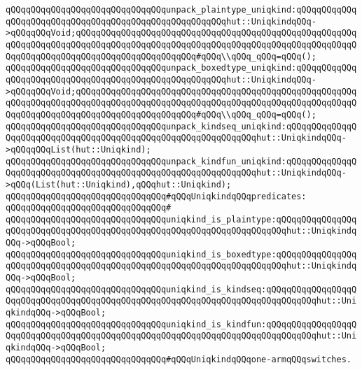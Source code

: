 \verb|qQQqqQQqqQQqqQQqqQQqqQQqqQQqqQQqunpack_plaintype_uniqkind:qQQqqQQqqQQqqQQqqQQqqQQqqQQqqQQqqQQqqQQqqQQqqQQqqQQqqQQqhut::UniqkindqQQq->qQQqqQQqVoid;qQQqqQQqqQQqqQQqqQQqqQQqqQQqqQQqqQQqqQQqqQQqqQQqqQQqqQQqqQQqqQQqqQQqqQQqqQQqqQQqqQQqqQQqqQQqqQQqqQQqqQQqqQQqqQQqqQQqqQQqqQQqqQQqqQQqqQQqqQQqqQQqqQQqqQQqqQQqqQQqqQQq#qQQq\\qQQq_qQQq=qQQq();|\newline
\verb|qQQqqQQqqQQqqQQqqQQqqQQqqQQqqQQqunpack_boxedtype_uniqkind:qQQqqQQqqQQqqQQqqQQqqQQqqQQqqQQqqQQqqQQqqQQqqQQqqQQqqQQqhut::UniqkindqQQq->qQQqqQQqVoid;qQQqqQQqqQQqqQQqqQQqqQQqqQQqqQQqqQQqqQQqqQQqqQQqqQQqqQQqqQQqqQQqqQQqqQQqqQQqqQQqqQQqqQQqqQQqqQQqqQQqqQQqqQQqqQQqqQQqqQQqqQQqqQQqqQQqqQQqqQQqqQQqqQQqqQQqqQQqqQQqqQQq#qQQq\\qQQq_qQQq=qQQq();|\newline
\verb|qQQqqQQqqQQqqQQqqQQqqQQqqQQqqQQqunpack_kindseq_uniqkind:qQQqqQQqqQQqqQQqqQQqqQQqqQQqqQQqqQQqqQQqqQQqqQQqqQQqqQQqqQQqqQQqhut::UniqkindqQQq->qQQqqQQqList(hut::Uniqkind);|\newline
\verb|qQQqqQQqqQQqqQQqqQQqqQQqqQQqqQQqunpack_kindfun_uniqkind:qQQqqQQqqQQqqQQqqQQqqQQqqQQqqQQqqQQqqQQqqQQqqQQqqQQqqQQqqQQqqQQqhut::UniqkindqQQq->qQQq(List(hut::Uniqkind),qQQqhut::Uniqkind);|\newline
\newline
\verb|qQQqqQQqqQQqqQQqqQQqqQQqqQQqqQQq#qQQqUniqkindqQQqpredicates:|\newline
\verb|qQQqqQQqqQQqqQQqqQQqqQQqqQQqqQQq#|\newline
\verb|qQQqqQQqqQQqqQQqqQQqqQQqqQQqqQQquniqkind_is_plaintype:qQQqqQQqqQQqqQQqqQQqqQQqqQQqqQQqqQQqqQQqqQQqqQQqqQQqqQQqqQQqqQQqqQQqqQQqhut::UniqkindqQQq->qQQqBool;|\newline
\verb|qQQqqQQqqQQqqQQqqQQqqQQqqQQqqQQquniqkind_is_boxedtype:qQQqqQQqqQQqqQQqqQQqqQQqqQQqqQQqqQQqqQQqqQQqqQQqqQQqqQQqqQQqqQQqqQQqqQQqhut::UniqkindqQQq->qQQqBool;|\newline
\verb|qQQqqQQqqQQqqQQqqQQqqQQqqQQqqQQquniqkind_is_kindseq:qQQqqQQqqQQqqQQqqQQqqQQqqQQqqQQqqQQqqQQqqQQqqQQqqQQqqQQqqQQqqQQqqQQqqQQqqQQqqQQqhut::UniqkindqQQq->qQQqBool;|\newline
\verb|qQQqqQQqqQQqqQQqqQQqqQQqqQQqqQQquniqkind_is_kindfun:qQQqqQQqqQQqqQQqqQQqqQQqqQQqqQQqqQQqqQQqqQQqqQQqqQQqqQQqqQQqqQQqqQQqqQQqqQQqqQQqhut::UniqkindqQQq->qQQqBool;|\newline
\newline
\verb|qQQqqQQqqQQqqQQqqQQqqQQqqQQqqQQq#qQQqUniqkindqQQqone-armqQQqswitches.|\newline
